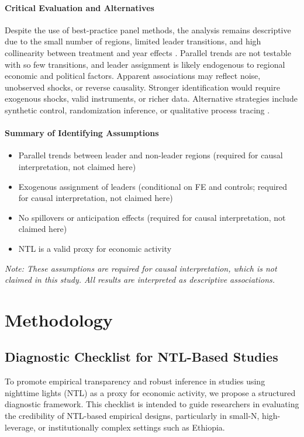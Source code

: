 \documentclass[12pt,a4paper]{article}
\begin{document}
\paragraph{Critical Evaluation and Alternatives}
Despite the use of best-practice panel methods, the analysis remains descriptive due to the small number of regions, limited leader transitions, and high collinearity between treatment and year effects \citep{Bertrand2004}. Parallel trends are not testable with so few transitions, and leader assignment is likely endogenous to regional economic and political factors. Apparent associations may reflect noise, unobserved shocks, or reverse causality. Stronger identification would require exogenous shocks, valid instruments, or richer data. Alternative strategies include synthetic control, randomization inference, or qualitative process tracing \citep{Abadie2010, Imbens2015}.

\paragraph{Summary of Identifying Assumptions}
\begin{itemize}
\item Parallel trends between leader and non-leader regions (required for causal interpretation, not claimed here)
\item Exogenous assignment of leaders (conditional on FE and controls; required for causal interpretation, not claimed here)
\item No spillovers or anticipation effects (required for causal interpretation, not claimed here)
\item NTL is a valid proxy for economic activity
\end{itemize}
\textit{Note: These assumptions are required for causal interpretation, which is not claimed in this study. All results are interpreted as descriptive associations.}
\section{Methodology}
\subsection*{Diagnostic Checklist for NTL-Based Studies}
To promote empirical transparency and robust inference in studies using nighttime lights (NTL) as a proxy for economic activity, we propose a structured diagnostic framework. This checklist is intended to guide researchers in evaluating the credibility of NTL-based empirical designs, particularly in small-N, high-leverage, or institutionally complex settings such as Ethiopia.
\end{document}

